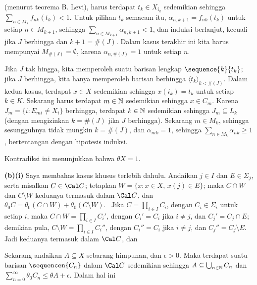{

\noindent (menurut teorema B. Levi), harus terdapat $t_k\in X_{i_k}$ sedemikian
sehingga $\sum_{n\in M_k}f_{nk}(t_{k})<1$. Untuk pilihan
$t_k$ semacam itu, $\alpha_{n,k+1}=f_{nk}(t_k)$ untuk setiap $n\in M_{k+1}$, sehingga
$\sum_{n\in M_{k+1}}\alpha_{n,k+1}<1$, dan induksi berlanjut,
kecuali jika $J$ berhingga dan $k+1=\#(J)$. Dalam kasus terakhir ini kita harus
mempunyai $M_{\#(J)}=\emptyset$, karena $\alpha_{n,\#(J)}=1$ untuk setiap $n$.

\medskip

 Jika $J$ tak hingga, kita memperoleh suatu barisan lengkap
$\sequence{k}{t_k}$; jika $J$ berhingga, kita hanya memperoleh barisan berhingga
$\langle t_k\rangle_{k<\#(J)}$. Dalam kedua kasus, terdapat $x\in X$
sedemikian sehingga $x(i_k)=t_k$ untuk setiap $k\in K$. Sekarang harus terdapat
$m\in\Bbb N$ sedemikian sehingga $x\in C_m$. Karena $J_m=\{i:E_{mi}\ne X_i\}$
berhingga, terdapat $k\in\Bbb N$ sedemikian sehingga $J_m\subseteq L_k$
(dengan mengizinkan $k=\#(J)$ jika $J$ berhingga). Sekarang $m\in M_k$, sehingga
sesungguhnya tidak mungkin $k=\#(J)$, dan
$\alpha_{mk}=1$, sehingga $\sum_{n\in M_k}\alpha_{nk}\ge 1$, bertentangan dengan
hipotesis induksi.\ \Bang

Kontradiksi ini menunjukkan bahwa $\theta X=1$.

\medskip

{\bf (b)(i)} Saya membahas kasus khusus terlebih dahulu.
Andaikan $j\in I$ dan
$E\in\Sigma_j$, serta misalkan $C\in\Cal C$; tetapkan $W=\{x:x\in X$, $x(j)\in
E\}$;
maka $C\cap W$ dan $C\setminus W$ keduanya termasuk dalam $\Cal C$, dan $\theta_0
C=\theta_0(C\cap W)+\theta_0(C\setminus W)$. \Prf\ Jika
$C=\prod_{i\in I}C_i$, dengan $C_i\in\Sigma_i$ untuk setiap $i$, maka
$C\cap W=\prod_{i\in I}C_i'$, dengan $C_i'=C_i$ jika $i\ne j$, dan
$C_j'=C_j\cap E$; demikian pula,
$C\setminus W=\prod_{i\in I}C_i''$, dengan $C_i''=C_i$ jika $i\ne j$, dan
$C_j''=C_j\setminus E$. Jadi keduanya termasuk dalam $\Cal C$, dan


\medskip

 Sekarang andaikan $A\subseteq X$ sebarang himpunan, dan
$\epsilon>0$. Maka terdapat suatu barisan $\sequencen{C_n}$ dalam $\Cal C$
sedemikian sehingga $A\subseteq\bigcup_{n\in\Bbb N}C_n$ dan
$\sum_{n=0}^{\infty}\theta_0C_n\le\theta A+\epsilon$. Dalam hal ini

}

